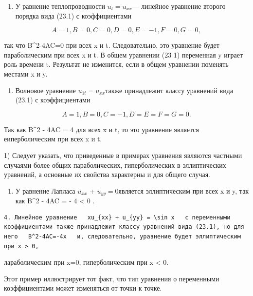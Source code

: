 \documentclass[
  ukrainian,
]{article}
\providecommand{\tightlist}{%
  \setlength{\itemsep}{0pt}\setlength{\parskip}{0pt}}
\begin{document}
\begin{enumerate}
\def\labelenumi{\arabic{enumi}.}
\tightlist
\item
  У равнение теплопроводности \(u_t = u_{xx}\)--- линейное уравнение
  второго порядка вида (23.1) с коэффициентами
\end{enumerate}

\[
A=1
,   B=0  ,   C=0  ,   D=0  ,   E=-1  ,   F=0  ,   G=0  ,
\]

так что B\^{}2-4AC=0 при всех x и t. Следовательно, это уравнение будет
параболическим при всех x и t. В общем уравнении (23 1) переменная y
играет роль времени t. Результат не изменится, если в общем уравнении
поменять местами x и y.

\begin{enumerate}
\def\labelenumi{\arabic{enumi}.}
\setcounter{enumi}{1}
\tightlist
\item
  Волновое уравнение \(u_{1t} = u_{xx}\)также принадлежит классу
  уравнений вида (23.1) с коэффициентами
\end{enumerate}

\[
A=1
,   B=0  ,   C=-1  ,   D=E=F=G=0  .
\]

Так как B\^{}2 - 4AC = 4 для всех x и t, то это уравнение является
еиперболическим при всех x и t.

1) Следует указать, что приведенные в примерах уравнения являются
частными случаями более общих параболических, гиперболических в
эллиптических уравнений, а основные их свойства характерны и для общего
случая.

\begin{enumerate}
\def\labelenumi{\arabic{enumi}.}
\setcounter{enumi}{2}
\tightlist
\item
  У равнение Лапласа \(u_{xx}\) + \(u_{yy} = 0\)является эллиптическим
  при всех x и y, так как B\^{}2 - 4AC = - 4 \textless{} 0 .
\end{enumerate}

\begin{verbatim}
4. Линейное уравнение   xu_{xx} + u_{yy} = \sin x   с переменными коэффициентами также принадлежит классу уравнений вида (23.1), но для него   B^2-4AC=-4x   и, следовательно, уравнение будет эллиптическим при x > 0,
\end{verbatim}

лараболическим при x=0, гиперболическим при x \textless{} 0.

Этот пример иллюстрирует тот факт, что тип уравнения о переменными
коэффициентами может изменяться от точки к точке.
\end{document}

